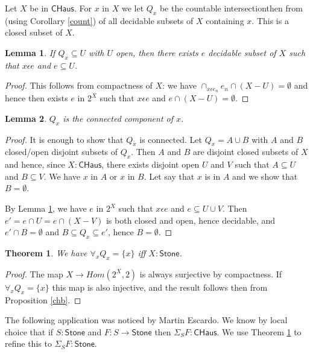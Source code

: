 \documentclass[10pt,a4paper]{article}
\newtheorem{theorem}{Theorem}[section]
\newtheorem{lemma}{Lemma}[section]
\newcommand{\Stone}{\mathsf{Stone}}
\newcommand{\CHaus}{\mathsf{CHaus}}
\begin{document}
Let $X$ be in $\CHaus$. For $x$ in $X$ we let $Q_x$ be the countable intersectionthen from
(using Corollary \ref{count}) of all decidable subsets of $X$ containing $x$. This
is a closed subset of $X$.

\begin{lemma}\label{sep}
  If $Q_x\subseteq U$ with $U$ open, then there exists $e$ decidable subset of $X$
  such that $x\epsilon e$ and $e\subseteq U$.
\end{lemma}

\begin{proof}
  This follows from compactness of $X$: we have $\cap_{x\epsilon e_n}e_n\cap (X-U) = \emptyset$
  and hence then exists $e$ in $2^X$ such that $x\epsilon e$ and $e\cap (X-U) = \emptyset$.
\end{proof}

\begin{lemma}\label{conn}
  $Q_x$ is the connected component of $x$.
\end{lemma}

\begin{proof}
  It is enough to show that $Q_x$ is connected. Let $Q_x = A\cup B$ with $A$ and $B$ closed/open
  disjoint subsets of $Q_x$. Then $A$ and $B$ are disjoint closed subsets of $X$ and hence, since $X:\CHaus$,
  there exists disjoint open $U$ and $V$ such that $A\subseteq U$ and $B\subseteq V$.
  We have $x$ in $A$ or $x$ in $B$. Let say that $x$ is in $A$ and we show that $B = \emptyset$.

  By Lemma \ref{sep}, we have $e$ in $2^X$ such that $x\epsilon e$ and $e\subseteq U\cup V$.
  Then $e'= e\cap U = e\cap (X-V)$ is both closed and open, hence decidable, and $e'\cap B = \emptyset$
  and $B\subseteq Q_x\subseteq e'$, hence $B = \emptyset$.
\end{proof}

\begin{theorem}\label{char}
  We have $\forall_x Q_x = \{x\}$ iff $X:\Stone$.
\end{theorem}

\begin{proof}
  The map $X\rightarrow Hom(2^X,2)$ is always surjective by compactness.
  If $\forall_x Q_x = \{x\}$ this map is also injective, and the result follows then from
  Proposition \ref{chb}.
\end{proof}

The following application was noticed by Martin Escardo. We know by local choice
that if $S:\Stone$ and $F:S\rightarrow\Stone$ then $\Sigma_SF:\CHaus$.
We use Theorem \ref{char} to refine this to $\Sigma_SF:\Stone$.
\end{document}
